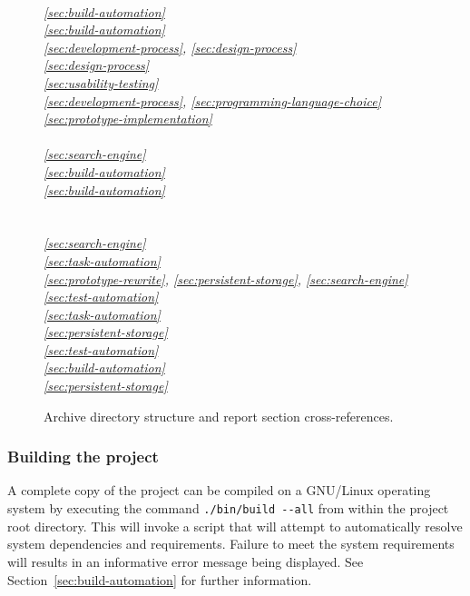 \begin{figure}[H]
\begin{multicols}{2}
\textit{%
\br{}\\ %
\ref{sec:build-automation}\\ %
\ref{sec:build-automation}\\ %
\ref{sec:development-process}, \ref{sec:design-process}\\ %
\ref{sec:design-process}\\ %
\ref{sec:usability-testing}\\ %
\ref{sec:development-process}, \ref{sec:programming-language-choice}\\ %
\ref{sec:prototype-implementation}\\ %
\br{}\\                                    %
\ref{sec:search-engine}\\ %
\ref{sec:build-automation}\\ %
\ref{sec:build-automation}\\ %
\br{}\\                                    %
\br{}\\                                    %
\ref{sec:search-engine}\\ %
\ref{sec:task-automation}\\ %
\ref{sec:prototype-rewrite}, \ref{sec:persistent-storage}, \ref{sec:search-engine}\\ %
\ref{sec:test-automation}\\ %
\ref{sec:task-automation}\\ %
\ref{sec:persistent-storage}\\ %
\ref{sec:test-automation}\\ %
\ref{sec:build-automation}\\ %
\ref{sec:persistent-storage}\\ %
}
\end{multicols}
\caption[Archive directory structure]
        {Archive directory structure and report section cross-references.}
\label{fig:dir-tree}
\end{figure}

\newpage
\subsubsection*{Building the project}
A complete copy of the project can be compiled on a GNU/Linux
operating system by executing the command \texttt{./bin/build -{}-all}
from within the project root directory. This will invoke a script that
will attempt to automatically resolve system dependencies and
requirements. Failure to meet the system requirements will results in
an informative error message being displayed. See
Section~\ref{sec:build-automation} for further information.

